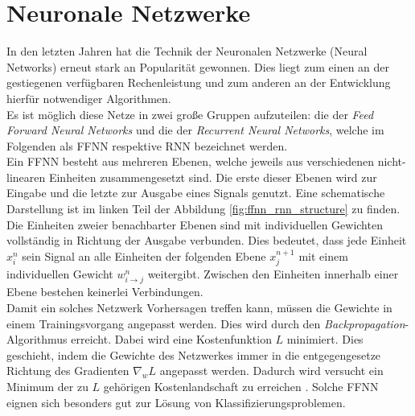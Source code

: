 \section{Neuronale Netzwerke}
In den letzten Jahren hat die Technik der Neuronalen Netzwerke (Neural Networks) erneut stark an Popularität gewonnen. Dies liegt zum einen an der gestiegenen verfügbaren Rechenleistung und zum anderen an der Entwicklung hierfür notwendiger Algorithmen.\\
Es ist möglich diese Netze in zwei große Gruppen aufzuteilen: die der \textit{Feed Forward Neural Networks} und die der \textit{Recurrent Neural Networks}, welche im Folgenden als \textsc{FFNN} respektive \textsc{RNN} bezeichnet werden.\\

Ein \textsc{FFNN} besteht aus mehreren Ebenen, welche jeweils aus verschiedenen nicht-linearen Einheiten zusammengesetzt sind. Die erste dieser Ebenen wird zur Eingabe und die letzte zur Ausgabe eines Signals genutzt. Eine schematische Darstellung ist im linken Teil der Abbildung \ref{fig:ffnn_rnn_structure} zu finden. Die Einheiten zweier benachbarter Ebenen sind mit individuellen Gewichten vollständig in Richtung der Ausgabe verbunden. Dies bedeutet, dass jede Einheit $x^n_i$ sein Signal an alle Einheiten der folgenden Ebene $x^{n+1}_j$ mit einem individuellen Gewicht $w^n_{i \rightarrow j}$ weitergibt. Zwischen den Einheiten innerhalb einer Ebene bestehen keinerlei Verbindungen.\\
Damit ein solches Netzwerk Vorhersagen treffen kann, müssen die Gewichte in einem Trainingsvorgang angepasst werden. Dies wird durch den \textit{Backpropagation}-Algorithmus erreicht. Dabei wird eine Kostenfunktion $L$ minimiert. Dies geschieht, indem die Gewichte des Netzwerkes immer in die entgegengesetze Richtung des Gradienten $\nabla_w L$ angepasst werden. Dadurch wird versucht ein Minimum der zu $L$ gehörigen Kostenlandschaft zu erreichen \cite[S. 225-290]{bishop}. Solche \textsc{FFNN} eignen sich besonders gut zur Lösung von Klassifizierungsproblemen.\\

